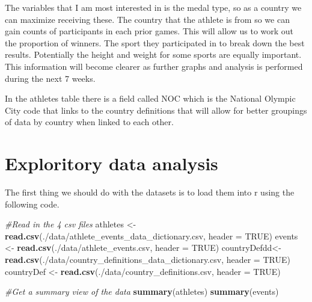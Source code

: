 \documentclass[
]{article}
\newenvironment{Shaded}{\begin{snugshade}}{\end{snugshade}}
\newcommand{\AttributeTok}[1]{\textcolor[rgb]{0.13,0.29,0.53}{#1}}
\newcommand{\CommentTok}[1]{\textcolor[rgb]{0.56,0.35,0.01}{\textit{#1}}}
\newcommand{\ConstantTok}[1]{\textcolor[rgb]{0.56,0.35,0.01}{#1}}
\newcommand{\FunctionTok}[1]{\textcolor[rgb]{0.13,0.29,0.53}{\textbf{#1}}}
\newcommand{\NormalTok}[1]{#1}
\newcommand{\OtherTok}[1]{\textcolor[rgb]{0.56,0.35,0.01}{#1}}
\newcommand{\StringTok}[1]{\textcolor[rgb]{0.31,0.60,0.02}{#1}}
\begin{document}
The variables that I am most interested in is the medal type, so as a
country we can maximize receiving these. The country that the athlete is
from so we can gain counts of participants in each prior games. This
will allow us to work out the proportion of winners. The sport they
participated in to break down the best results. Potentially the height
and weight for some sports are equally important. This information will
become clearer as further graphs and analysis is performed during the
next 7 weeks.

In the athletes table there is a field called NOC which is the National
Olympic City code that links to the country definitions that will allow
for better groupings of data by country when linked to each other.

\section{Exploritory data analysis}\label{exploritory-data-analysis}

The first thing we should do with the datasets is to load them into r using the following code.

\begin{Shaded}
\begin{Highlighting}[]
\CommentTok{\#Read in the 4 csv files}
\NormalTok{athletes }\OtherTok{\textless{}{-}} \FunctionTok{read.csv}\NormalTok{(}\StringTok{\textquotesingle{}./data/athlete\_events\_data\_dictionary.csv\textquotesingle{}}\NormalTok{, }
                     \AttributeTok{header =} \ConstantTok{TRUE}\NormalTok{)}
\NormalTok{events }\OtherTok{\textless{}{-}} \FunctionTok{read.csv}\NormalTok{(}\StringTok{\textquotesingle{}./data/athlete\_events.csv\textquotesingle{}}\NormalTok{, }
                   \AttributeTok{header =} \ConstantTok{TRUE}\NormalTok{)}
\NormalTok{countryDefdd}\OtherTok{\textless{}{-}} \FunctionTok{read.csv}\NormalTok{(}\StringTok{\textquotesingle{}./data/country\_definitions\_data\_dictionary.csv\textquotesingle{}}\NormalTok{,}
                        \AttributeTok{header =} \ConstantTok{TRUE}\NormalTok{)}
\NormalTok{countryDef }\OtherTok{\textless{}{-}} \FunctionTok{read.csv}\NormalTok{(}\StringTok{\textquotesingle{}./data/country\_definitions.csv\textquotesingle{}}\NormalTok{,}
                       \AttributeTok{header =} \ConstantTok{TRUE}\NormalTok{)}

\CommentTok{\#Get a summary view of the data}
\FunctionTok{summary}\NormalTok{(athletes)}
\FunctionTok{summary}\NormalTok{(events)}
\end{Highlighting}
\end{Shaded}
\end{document}
